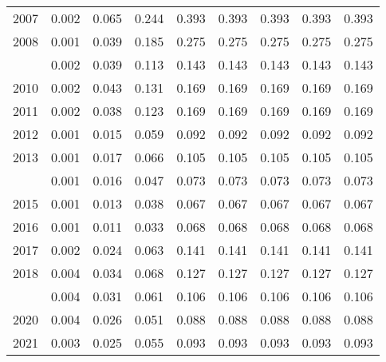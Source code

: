 \documentclass[
]{article}
\begin{document}
\begin{longtable}[t]{lrrrrrrrr}
2007 & 0.002 & 0.065 & 0.244 & 0.393 & 0.393 & 0.393 & 0.393 & 0.393\\
2008 & 0.001 & 0.039 & 0.185 & 0.275 & 0.275 & 0.275 & 0.275 & 0.275\\
\addlinespace
2009 & 0.002 & 0.039 & 0.113 & 0.143 & 0.143 & 0.143 & 0.143 & 0.143\\
2010 & 0.002 & 0.043 & 0.131 & 0.169 & 0.169 & 0.169 & 0.169 & 0.169\\
2011 & 0.002 & 0.038 & 0.123 & 0.169 & 0.169 & 0.169 & 0.169 & 0.169\\
2012 & 0.001 & 0.015 & 0.059 & 0.092 & 0.092 & 0.092 & 0.092 & 0.092\\
2013 & 0.001 & 0.017 & 0.066 & 0.105 & 0.105 & 0.105 & 0.105 & 0.105\\
\addlinespace
2014 & 0.001 & 0.016 & 0.047 & 0.073 & 0.073 & 0.073 & 0.073 & 0.073\\
2015 & 0.001 & 0.013 & 0.038 & 0.067 & 0.067 & 0.067 & 0.067 & 0.067\\
2016 & 0.001 & 0.011 & 0.033 & 0.068 & 0.068 & 0.068 & 0.068 & 0.068\\
2017 & 0.002 & 0.024 & 0.063 & 0.141 & 0.141 & 0.141 & 0.141 & 0.141\\
2018 & 0.004 & 0.034 & 0.068 & 0.127 & 0.127 & 0.127 & 0.127 & 0.127\\
\addlinespace
2019 & 0.004 & 0.031 & 0.061 & 0.106 & 0.106 & 0.106 & 0.106 & 0.106\\
2020 & 0.004 & 0.026 & 0.051 & 0.088 & 0.088 & 0.088 & 0.088 & 0.088\\
2021 & 0.003 & 0.025 & 0.055 & 0.093 & 0.093 & 0.093 & 0.093 & 0.093\\*
\end{longtable}
\end{document}
